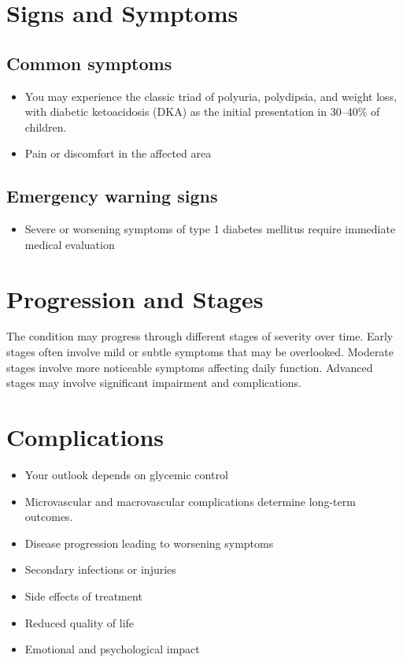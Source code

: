 \section{Signs and Symptoms}

\subsection{Common symptoms}
\begin{itemize}[noitemsep]
  \item You may experience the classic triad of polyuria, polydipsia, and weight loss, with diabetic ketoacidosis (DKA) as the initial presentation in 30--40\% of children.

  \item Pain or discomfort in the affected area
  \end{itemize}

\subsection{Emergency warning signs}
\begin{itemize}[noitemsep]
  \item Severe or worsening symptoms of type 1 diabetes mellitus require immediate medical evaluation
\end{itemize}
\section{Progression and Stages}
The condition may progress through different stages of severity over time. Early stages often involve mild or subtle symptoms that may be overlooked. Moderate stages involve more noticeable symptoms affecting daily function. Advanced stages may involve significant impairment and complications.
\section{Complications}
\begin{itemize}[noitemsep]
  \item Your outlook depends on glycemic control
  \item Microvascular and macrovascular complications determine long-term outcomes.
  \item Disease progression leading to worsening symptoms
  \item Secondary infections or injuries
  \item Side effects of treatment
  \item Reduced quality of life
  \item Emotional and psychological impact
\end{itemize}
